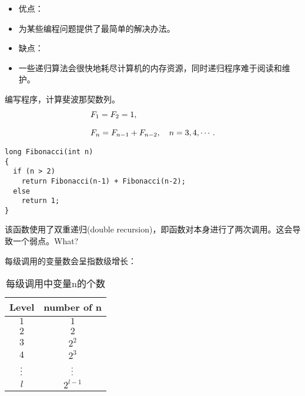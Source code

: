 \begin{frame}[fragile]
 

\begin{itemize}
\item 优点：
\item[] 
为某些编程问题提供了最简单的解决办法。\\[0.1in]
\item 缺点：
\item[]
一些递归算法会很快地耗尽计算机的内存资源，同时递归程序难于阅读和维护。
\end{itemize}

\end{frame}


\begin{frame}[fragile]
编写程序，计算斐波那契数列。
$$
\begin{aligned}
&F_1=F_2=1,\\[0.1in]
&F_n=F_{n-1}+F_{n-2}, \quad n=3,4,\cdots.
\end{aligned}
$$
\end{frame}


\begin{frame}[fragile]
\begin{lstlisting}
long Fibonacci(int n)
{
  if (n > 2)
    return Fibonacci(n-1) + Fibonacci(n-2);
  else
    return 1;
}
\end{lstlisting}

该函数使用了双重递归(double recursion)，即函数对本身进行了两次调用。这会导致一个弱点。{\Huge What?}
\end{frame}


\begin{frame}[fragile]
每级调用的变量数会呈指数级增长：
\begin{table}
\centering
\caption{每级调用中变量n的个数}
\begin{tabular}{cc}\hline
Level & number of n\\\hline
$1$ & $1$\\
$2$ & $2$\\
$3$ & $2^2$\\
$4$ & $2^3$\\
$\vdots$ & $\vdots$ \\
$l$ & $2^{l-1}$\\\hline
\end{tabular}
\end{table}
\end{frame}

